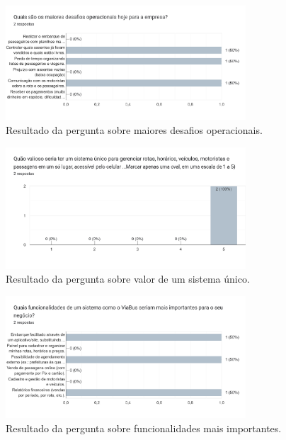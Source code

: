 \begin{apendicesenv}
  \begin{figure}[htbp]
    \centering
    \includegraphics[width=0.8\textwidth]{imagens/imagem6.png}
    \caption{Resultado da pergunta sobre maiores desafios operacionais.}
    \label{fig:maiores-desafios-operacionais}
  \end{figure}

  \begin{figure}[htbp]
    \centering
    \includegraphics[width=0.8\textwidth]{imagens/imagem7.png}
    \caption{Resultado da pergunta sobre valor de um sistema único.}
    \label{fig:valor-de-um-sistema-unico}
  \end{figure}

  \begin{figure}[htbp]
    \centering
    \includegraphics[width=0.8\textwidth]{imagens/imagem8.png}
    \caption{Resultado da pergunta sobre funcionalidades mais importantes.}
    \label{fig:funcionalidades-mais-importantes}
  \end{figure}


\end{apendicesenv}
